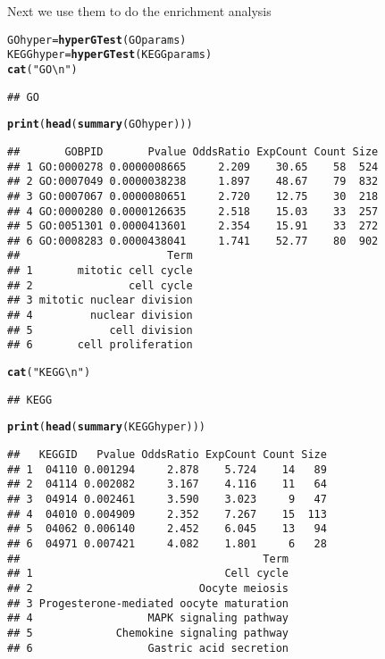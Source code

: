 \documentclass{article}\usepackage[]{graphicx}\usepackage[]{color}
\makeatletter
\newcommand{\hlstr}[1]{\textcolor[rgb]{0.192,0.494,0.8}{#1}}%
\newcommand{\hlstd}[1]{\textcolor[rgb]{0.345,0.345,0.345}{#1}}%
\newcommand{\hlkwb}[1]{\textcolor[rgb]{0.69,0.353,0.396}{#1}}%
\newcommand{\hlkwd}[1]{\textcolor[rgb]{0.737,0.353,0.396}{\textbf{#1}}}%
\newenvironment{kframe}{%
 \def\at@end@of@kframe{}%
 \ifinner\ifhmode%
  \def\at@end@of@kframe{\end{minipage}}%
  \begin{minipage}{\columnwidth}%
 \fi\fi%
 \def\FrameCommand##1{\hskip\@totalleftmargin \hskip-\fboxsep
 \colorbox{shadecolor}{##1}\hskip-\fboxsep
     \hskip-\linewidth \hskip-\@totalleftmargin \hskip\columnwidth}%
 \MakeFramed {\advance\hsize-\width
   \@totalleftmargin\z@ \linewidth\hsize
   \@setminipage}}%
 {\par\unskip\endMakeFramed%
 \at@end@of@kframe}
\newenvironment{knitrout}{}{} %
\makeatother
\begin{document}
Next we use them to do the enrichment analysis
\begin{knitrout}
\color{fgcolor}\begin{kframe}
\begin{alltt}
\hlstd{GOhyper} \hlkwb{=} \hlkwd{hyperGTest}\hlstd{(GOparams)}
\hlstd{KEGGhyper} \hlkwb{=} \hlkwd{hyperGTest}\hlstd{(KEGGparams)}
\hlkwd{cat}\hlstd{(}\hlstr{"GO\textbackslash{}n"}\hlstd{)}
\end{alltt}
\begin{verbatim}
## GO
\end{verbatim}
\begin{alltt}
\hlkwd{print}\hlstd{(}\hlkwd{head}\hlstd{(}\hlkwd{summary}\hlstd{(GOhyper)))}
\end{alltt}
\begin{verbatim}
##       GOBPID       Pvalue OddsRatio ExpCount Count Size
## 1 GO:0000278 0.0000008665     2.209    30.65    58  524
## 2 GO:0007049 0.0000038238     1.897    48.67    79  832
## 3 GO:0007067 0.0000080651     2.720    12.75    30  218
## 4 GO:0000280 0.0000126635     2.518    15.03    33  257
## 5 GO:0051301 0.0000413601     2.354    15.91    33  272
## 6 GO:0008283 0.0000438041     1.741    52.77    80  902
##                       Term
## 1       mitotic cell cycle
## 2               cell cycle
## 3 mitotic nuclear division
## 4         nuclear division
## 5            cell division
## 6       cell proliferation
\end{verbatim}
\begin{alltt}
\hlkwd{cat}\hlstd{(}\hlstr{"KEGG\textbackslash{}n"}\hlstd{)}
\end{alltt}
\begin{verbatim}
## KEGG
\end{verbatim}
\begin{alltt}
\hlkwd{print}\hlstd{(}\hlkwd{head}\hlstd{(}\hlkwd{summary}\hlstd{(KEGGhyper)))}
\end{alltt}
\begin{verbatim}
##   KEGGID   Pvalue OddsRatio ExpCount Count Size
## 1  04110 0.001294     2.878    5.724    14   89
## 2  04114 0.002082     3.167    4.116    11   64
## 3  04914 0.002461     3.590    3.023     9   47
## 4  04010 0.004909     2.352    7.267    15  113
## 5  04062 0.006140     2.452    6.045    13   94
## 6  04971 0.007421     4.082    1.801     6   28
##                                      Term
## 1                              Cell cycle
## 2                          Oocyte meiosis
## 3 Progesterone-mediated oocyte maturation
## 4                  MAPK signaling pathway
## 5             Chemokine signaling pathway
## 6                  Gastric acid secretion
\end{verbatim}
\end{kframe}
\end{knitrout}
\end{document}
